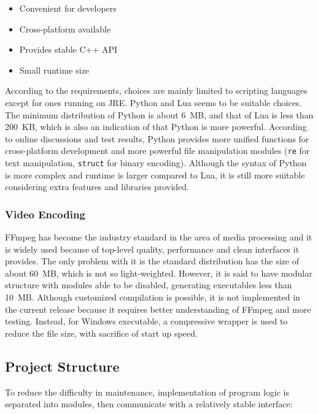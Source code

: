 \begin{itemize}[noitemsep,nolistsep]
	\item Convenient for developers
	\item Cross-platform available
	\item Provides stable C++ API
	\item Small runtime size
\end{itemize}

According to the requirements, choices are mainly limited to scripting languages except for ones running on JRE. Python and Lua seems to be suitable choices. The minimum distribution of Python is about \SI{6}{MB}, and that of Lua is less than \SI{200}{KB}, which is also an indication of that Python is more powerful. According to online discussions and test results, Python provides more unified functions for cross-platform development and more powerful file manipulation modules (\texttt{re} for text manipulation, \texttt{struct} for binary encoding). Although the syntax of Python is more complex and runtime is larger compared to Lua, it is still more suitable considering extra features and libraries provided.

\subsubsection{Video Encoding}

FFmpeg has become the industry standard in the area of media processing and it is widely used because of top-level quality, performance and clean interfaces it provides. The only problem with it is the standard distribution has the size of about \SI{60}{MB}, which is not so light-weighted. However, it is said to have modular structure with modules able to be disabled, generating executables less than \SI{10}{MB}. Although customized compilation is possible, it is not implemented in the current release because it requires better understanding of FFmpeg and more testing. Instead, for Windows executable, a compressive wrapper is used to reduce the file size, with sacrifice of start up speed.

\subsection{Project Structure}

To reduce the difficulty in maintenance, implementation of program logic is separated into modules, then communicate with a relatively stable interface:

